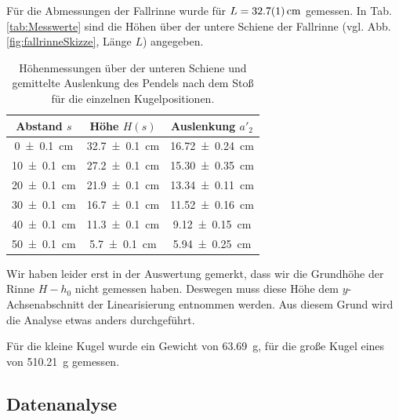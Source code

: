 	Für die Abmessungen der Fallrinne wurde für $L = \SI{32,7 +- 0,1}{\centi\meter}$ gemessen.
	In Tab. \ref{tab:Messwerte} sind die Höhen über der untere Schiene der Fallrinne (vgl. Abb. \ref{fig:fallrinneSkizze}, Länge $L$) angegeben.
	\begin{table}[ht]
		\centering
		\caption{Höhenmessungen über der unteren Schiene und gemittelte Auslenkung des Pendels nach dem Stoß für die einzelnen Kugelpositionen.}
		\begin{tabular}{S|S|S}
			\hline
			{Abstand $s$} & {Höhe $H(s)$}  & {Auslenkung $a'_2$}\\
			\hline
			\SI{0 +- 0,1}{\centi\meter} & \SI{32,7 +- 0,1}{\centi\meter} & \SI{16,72 +- 0,24}{\centi\meter}\\
			\SI{10 +- 0,1}{\centi\meter} & \SI{27,2 +- 0,1}{\centi\meter} & \SI{15,30 +- 0,35}{\centi\meter}\\
			\SI{20 +- 0,1}{\centi\meter} & \SI{21,9 +- 0,1}{\centi\meter} & \SI{13,34 +- 0,11}{\centi\meter}\\
			\SI{30 +- 0,1}{\centi\meter} & \SI{16,7 +- 0,1}{\centi\meter} & \SI{11,52 +- 0,16}{\centi\meter}\\
			\SI{40 +- 0,1}{\centi\meter} & \SI{11,3 +- 0,1}{\centi\meter} & \SI{9,12 +- 0,15}{\centi\meter}\\
			\SI{50 +- 0,1}{\centi\meter} & \SI{5,7 +- 0,1}{\centi\meter} & \SI{5,94 +- 0,25}{\centi\meter}\\
			\hline
		\end{tabular}
	\end{table}
	Wir haben leider erst in der Auswertung gemerkt, dass wir die Grundhöhe der Rinne $H - h_0$ nicht gemessen haben.
	Deswegen muss diese Höhe dem $y$-Achsenabschnitt der Linearisierung entnommen werden.
	Aus diesem Grund wird die Analyse etwas anders durchgeführt.
	
	Für die kleine Kugel wurde ein Gewicht von \SI{63,69}{g}, für die große Kugel eines von \SI{510,21}{g} gemessen.
	
	\subsection{Datenanalyse}
	
